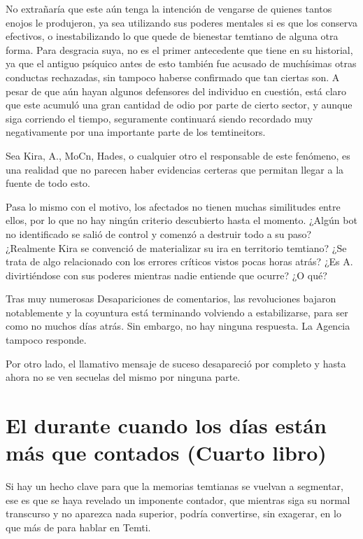 \documentclass[
]{book}
\begin{document}
No extrañaría que este aún tenga la intención de vengarse de quienes tantos enojos le produjeron, ya sea utilizando sus poderes mentales si es que los conserva efectivos, o inestabilizando lo que quede de bienestar temtiano de alguna otra forma. Para desgracia suya, no es el primer antecedente que tiene en su historial, ya que el antiguo psíquico antes de esto también fue acusado de muchísimas otras conductas rechazadas, sin tampoco haberse confirmado que tan ciertas son. A pesar de que aún hayan algunos defensores del individuo en cuestión, está claro que este acumuló una gran cantidad de odio por parte de cierto sector, y aunque siga corriendo el tiempo, seguramente continuará siendo recordado muy negativamente por una importante parte de los temtineitors.

Sea Kira, A., MoCn, Hades, o cualquier otro el responsable de este fenómeno, es una realidad que no parecen haber evidencias certeras que permitan llegar a la fuente de todo esto.

Pasa lo mismo con el motivo, los afectados no tienen muchas similitudes entre ellos, por lo que no hay ningún criterio descubierto hasta el momento. ¿Algún bot no identificado se salió de control y comenzó a destruir todo a su paso? ¿Realmente Kira se convenció de materializar su ira en territorio temtiano? ¿Se trata de algo relacionado con los errores críticos vistos pocas horas atrás? ¿Es A. divirtiéndose con sus poderes mientras nadie entiende que ocurre? ¿O qué?

Tras muy numerosas Desapariciones de comentarios, las revoluciones bajaron notablemente y la coyuntura está terminando volviendo a estabilizarse, para ser como no muchos días atrás. Sin embargo, no hay ninguna respuesta. La Agencia tampoco responde.

Por otro lado, el llamativo mensaje de suceso desapareció por completo y hasta ahora no se ven secuelas del mismo por ninguna parte.

\hypertarget{el-durante-cuando-los-duxedas-estuxe1n-muxe1s-que-contados-cuarto-libro}{%
\chapter{El durante cuando los días están más que contados (Cuarto libro)}\label{el-durante-cuando-los-duxedas-estuxe1n-muxe1s-que-contados-cuarto-libro}}

Si hay un hecho clave para que la memorias temtianas se vuelvan a segmentar, ese es que se haya revelado un imponente contador, que mientras siga su normal transcurso y no aparezca nada superior, podría convertirse, sin exagerar, en lo que más de para hablar en Temti.
\end{document}
